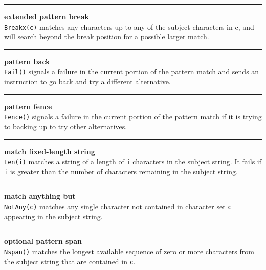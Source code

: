 \bigskip\hrule\vspace{0.1cm}
 \hfill{\bf extended pattern break}\\

\noindent
\texttt{Breakx(c)} matches any characters up to any of the subject
characters in c, and 
will search beyond the break position for a possible larger match.\\


\bigskip\hrule\vspace{0.1cm}
 \hfill{\bf pattern back}\\

\noindent
\texttt{Fail()} signals a failure in the current portion of the
pattern match and sends 
an instruction to go back and try a different alternative.\\


\bigskip\hrule\vspace{0.1cm}
 \hfill{\bf pattern fence}\\

\noindent
\texttt{Fence()} signals a failure in the current portion of the pattern match
if it is trying to backing up to try other alternatives.\\


\bigskip\hrule\vspace{0.1cm}
 \hfill{\bf match fixed-length string}\\

\noindent
\texttt{Len(i)} matches a string of a length of \texttt{i} characters
in the subject string.
It fails if \texttt{i} is greater than the number of characters remaining
in the subject string.\\


\bigskip\hrule\vspace{0.1cm}
 \hfill{\bf match anything but}\\

\noindent
\texttt{NotAny(c)} matches any single character not contained in
character set \texttt{c} appearing in the subject string.\\


\bigskip\hrule\vspace{0.1cm}
 \hfill{\bf optional pattern span}\\

\noindent
\texttt{Nspan()} matches the longest available sequence of zero or
more characters from the subject string that are contained in \texttt{c}.  \\


